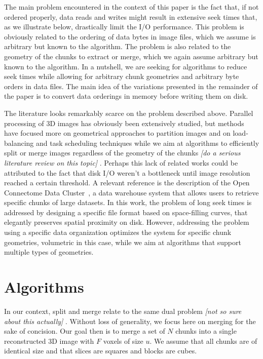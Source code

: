 \documentclass[10pt, conference, compsocconf]{IEEEtran}
\newcommand{\todo}[1]{
  \color{red}\emph{[#1]}
  \color{black}
}
\begin{document}
The main problem encountered in the context of this paper is the fact
that, if not ordered properly, data reads and writes might result in
extensive seek times that, as we illustrate below, drastically limit
the I/O performance. This problem is obviously related to the ordering
of data bytes in image files, which we assume is arbitrary but known
to the algorithm. The problem is also related to the geometry of the
chunks to extract or merge, which we again assume arbitrary but known
to the algorithm. In a nutshell, we are seeking for algorithms to
reduce seek times while allowing for arbitrary chunk geometries and
arbitrary byte orders in data files. The main idea of the variations
presented in the remainder of the paper is to convert data orderings
in memory before writing them on disk. 

The literature looks remarkably scarce on the problem described
above. Parallel processing of 3D images has obviously been extensively
studied, but methods have focused more on geometrical approaches to
partition images and on load-balancing and task scheduling techniques
while we aim at algorithms to efficiently split or merge images
regardless of the geometry of the chunks \todo{do a serious literature
review on this topic}. Perhaps this lack of related works could be
attributed to the fact that disk I/O weren't a bottleneck until image
resolution reached a certain threshold. A relevant reference is the
description of the Open Connectome Data Cluster~\cite{burns2013open},
a data warehouse system that allows users to retrieve specific chunks
of large datasets. In this work, the problem of long seek times is
addressed by designing a specific file format based on space-filling
curves, that elegantly preserves spatial proximity on disk. However,
addressing the problem using a specific data organization optimizes
the system for specific chunk geometries, volumetric in this case,
while we aim at algorithms that support multiple types of geometries.


\section{Algorithms}

In our context, split and merge relate to the same dual
problem \todo{not so sure about this actually}. Without loss of
generality, we focus here on merging for the sake of concision. Our
goal then is to merge a set of $N$ chunks into a single reconstructed
3D image with $F$ voxels of size $u$. We assume that all chunks are of
identical size and that slices are squares and blocks are cubes.
\end{document}
